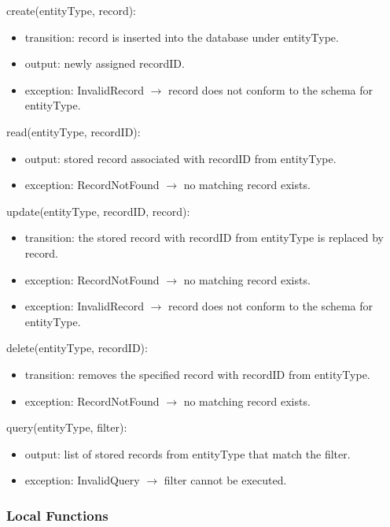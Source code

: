\documentclass[12pt, titlepage]{article}
\begin{document}
\noindent create(entityType, record):
\begin{itemize}
  \item transition: record is inserted into the database under entityType.
  \item output: newly assigned recordID.
  \item exception: InvalidRecord $\rightarrow$ record does not conform to the schema for entityType.
\end{itemize}

\noindent read(entityType, recordID):
\begin{itemize}
  \item output: stored record associated with recordID from entityType.
  \item exception: RecordNotFound $\rightarrow$ no matching record exists.
\end{itemize}

\noindent update(entityType, recordID, record):
\begin{itemize}
  \item transition: the stored record with recordID from entityType is replaced by record.
  \item exception: RecordNotFound $\rightarrow$ no matching record exists.
  \item exception: InvalidRecord $\rightarrow$ record does not conform to the schema for entityType.
\end{itemize}

\noindent delete(entityType, recordID):
\begin{itemize}
  \item transition: removes the specified record with recordID from entityType.
  \item exception: RecordNotFound $\rightarrow$ no matching record exists.
\end{itemize}

\noindent query(entityType, filter):
\begin{itemize}
  \item output: list of stored records from entityType that match the filter.
  \item exception: InvalidQuery $\rightarrow$ filter cannot be executed.
\end{itemize}

\subsubsection{Local Functions}
\end{document}
